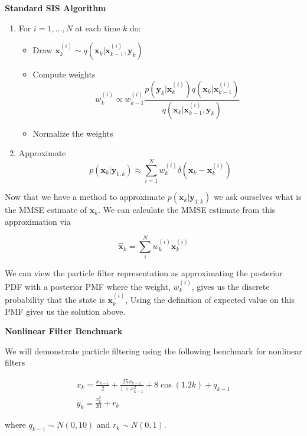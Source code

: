 \begin{framed}
\theoremstyle{remark}
\begin{remark}{\textbf{Standard SIS Algorithm}}

\begin{enumerate}
\item For $i=1,\ldots, N$ at each time $k$ do:
	\begin{itemize}
		\item Draw $\mathbf{x}_{k}^{(i)} \sim q(\mathbf{x}_k | \mathbf{x}_{k-1}^{(i)}, \mathbf{y}_k)$
		\item Compute weights
			\begin{equation}
				w_{k}^{(i)} \propto w_{k-1}^{(i)} \frac{p(\mathbf{y}_k | \mathbf{x}_{k}^{(i)})q(\mathbf{x}_k | \mathbf{x}_{k-1}^{(i)})}{q(\mathbf{x}_k | \mathbf{x}_{k-1}^{(i)}, \mathbf{y}_k)}
			\end{equation}
		\item Normalize the weights
	\end{itemize}
\item Approximate
\begin{equation}
p(\mathbf{x}_k | \mathbf{y}_{1:k}) \approx \sum_{i=1}^{N} w_{k}^{(i)} \delta(\mathbf{x}_k - \mathbf{x}_{k}^{(i)})
\end{equation}
\end{enumerate}

\end{remark}
\end{framed}

Now that we have a method to approximate $p(\mathbf{x}_k | \mathbf{y}_{1:k})$ we ask ourselves what is the MMSE estimate of $\mathbf{x}_k$.
We can  calculate the MMSE estimate from this approximation via

\begin{equation}
\hat{\mathbf{x}}_k = \sum_{i}^{N} w_{k}^{(i)} \mathbf{x}_{k}^{(i)}
\end{equation}

We can view the particle filter representation as approximating the posterior PDF with a posterior PMF where the weight, $w_{k}^{(i)}$, 
gives us the discrete probability that the state is $\mathbf{x}_{k}^{(i)}$, Using the definition of expected value on this PMF gives us the solution above.


\begin{framed}
\begin{exmp}{\textbf{Nonlinear Filter Benchmark}}

We will demonstrate particle filtering using the following benchmark for nonlinear filters

\begin{eqnarray}
x_k = \frac{x_{k-1}}{2} + \frac{25x_{k-1}}{1 + x_{k-1}^2} + 8 \cos(1.2k) + q_{k-1} \\
y_k = \frac{x_{k}^2}{20} + r_k
\end{eqnarray}

where $q_{k-1}\sim N(0,10)$ and $r_k \sim N(0,1)$.
\end{exmp}
\end{framed}

